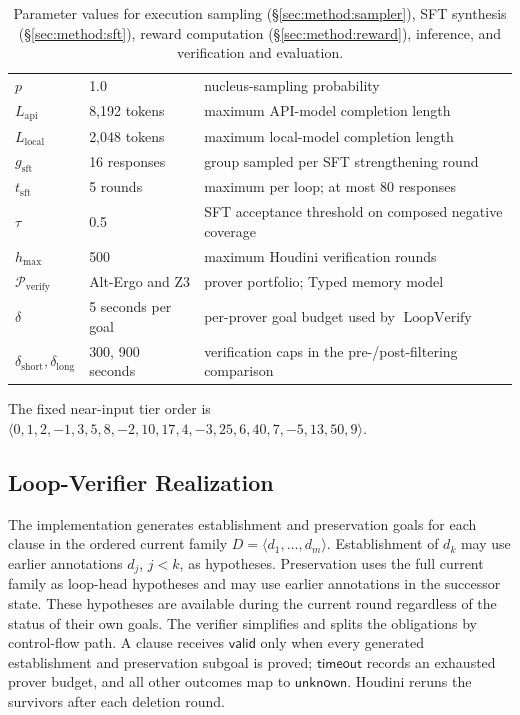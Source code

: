 \begin{table}[H]
\begin{tabular}{p{2.6cm}p{3.1cm}p{5.9cm}}
\(p\) & 1.0 & nucleus-sampling probability \\
\(L_{\mathrm{api}}\) & 8,192 tokens & maximum API-model completion length \\
\(L_{\mathrm{local}}\) & 2,048 tokens & maximum local-model completion length \\
\midrule
\(g_{\mathrm{sft}}\) & 16 responses & group sampled per SFT strengthening round \\
\(t_{\mathrm{sft}}\) & 5 rounds & maximum per loop; at most 80 responses \\
\(\tau\) & 0.5 & SFT acceptance threshold on composed negative coverage \\
\midrule
\(h_{\max}\) & 500 & maximum Houdini verification rounds \\
\(\mathcal P_{\mathrm{verify}}\) & Alt-Ergo and Z3 & prover portfolio; Typed memory model \\
\(\delta\) & 5 seconds per goal & per-prover goal budget used by \(\operatorname{LoopVerify}\) \\
\(\delta_{\mathrm{short}},\delta_{\mathrm{long}}\) & 300, 900 seconds & verification caps in the pre-/post-filtering comparison \\
\bottomrule
\end{tabular}
\caption{Parameter values for execution sampling
(\S\ref{sec:method:sampler}), SFT synthesis (\S\ref{sec:method:sft}),
reward computation (\S\ref{sec:method:reward}), inference, and
verification and evaluation.}
\label{tab:constants}
\end{table}
The fixed near-input tier order is
\(
\langle 0,1,2,-1,3,5,8,-2,10,17,4,-3,25,6,40,7,-5,13,50,9\rangle.
\)

\subsection{Loop-Verifier Realization}
\label{app:loop-verifier-realization}

The implementation generates establishment and preservation goals for each
clause in the ordered current family \(D=\langle d_1,\ldots,d_m\rangle\).
Establishment of \(d_k\) may use earlier annotations \(d_j\), \(j<k\), as
hypotheses.  Preservation uses the full current family as loop-head
hypotheses and may use earlier annotations in the successor state.  These
hypotheses are available during the current round regardless of the status of
their own goals.  The verifier simplifies and splits the obligations by
control-flow path.  A clause receives \(\mathsf{valid}\) only when every
generated establishment and preservation subgoal is proved;
\(\mathsf{timeout}\) records an exhausted prover budget, and all other
outcomes map to \(\mathsf{unknown}\).  Houdini reruns the survivors after each
deletion round.

